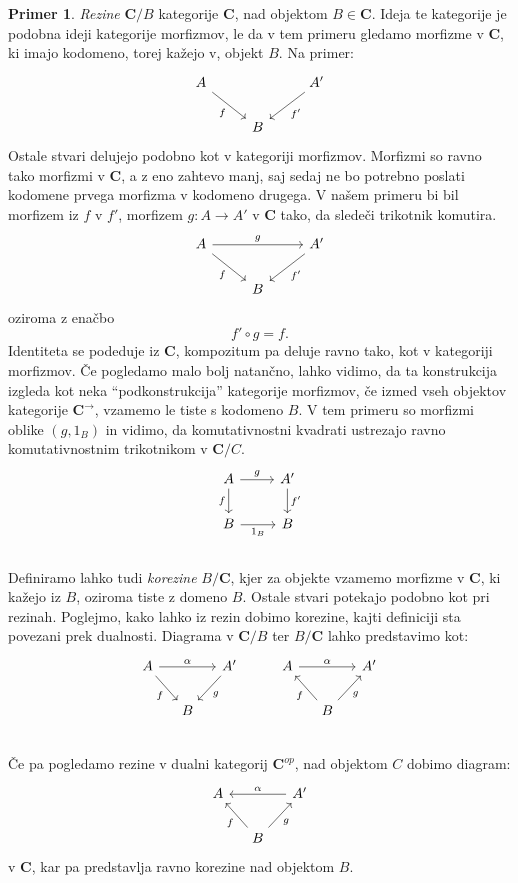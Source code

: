 \documentclass[12pt,a4paper]{book}
\theoremstyle{definition}
\theoremstyle{plain}
\theoremstyle{definition}
\newtheorem{primer}{Primer}[section]
\theoremstyle{remark}
\newcommand{\cat}[1]{\textbf{#1}}
\begin{document}
\begin{primer}
\emph{Rezine} $\cat{C}/B$ kategorije $\cat{C}$, nad objektom $B \in \cat{C}$. Ideja te kategorije je podobna ideji kategorije morfizmov, le da v tem primeru gledamo morfizme v $\cat{C}$, ki imajo kodomeno, torej kažejo v, objekt $B$. Na primer:
%
\[ \begin{tikzcd}
A \arrow[rd, "f"'] & & \arrow[ld, "f'"] A' \\
& B &
\end{tikzcd} \]
%
Ostale stvari delujejo podobno kot v kategoriji morfizmov. Morfizmi so ravno tako morfizmi v $\cat{C}$, a z eno zahtevo manj, saj sedaj ne bo potrebno poslati kodomene prvega morfizma v kodomeno drugega. V našem primeru bi bil morfizem iz $f$ v $f'$, morfizem $g : A \to A'$ v $\cat{C}$ tako, da sledeči trikotnik komutira.
%
\[ \begin{tikzcd}
A \arrow[rd, "f"'] \ar[rr, "g"] & & \arrow[ld, "f'"] A' \\
& B &
\end{tikzcd} \]
oziroma z enačbo
$$f' \circ g = f.$$
Identiteta se podeduje iz $\cat{C}$, kompozitum pa deluje ravno tako, kot v kategoriji morfizmov. Če pogledamo malo bolj natančno, lahko vidimo, da ta konstrukcija izgleda kot neka "`podkonstrukcija"' kategorije morfizmov, če izmed vseh objektov kategorije $\cat{C}^{\rightarrow}$, vzamemo le tiste s kodomeno $B$. V tem primeru so morfizmi oblike $(g, 1_B)$ in vidimo, da komutativnostni kvadrati ustrezajo ravno komutativnostnim trikotnikom v $\cat{C}/C$.
%
\[ \begin{tikzcd}
A \ar[d, "f"'] \ar[r, "g"] & A' \ar[d, "f'"] \\
B \ar[r, "1_B"'] & B \\
\end{tikzcd} \]
%
Definiramo lahko tudi \emph{korezine} $B/\cat{C}$, kjer za objekte vzamemo morfizme v $\cat{C}$, ki kažejo iz $B$, oziroma tiste z domeno $B$. Ostale stvari potekajo podobno kot pri rezinah.
Poglejmo, kako lahko iz rezin dobimo korezine, kajti definiciji sta povezani prek dualnosti.
Diagrama v $\cat{C}/B$ ter $B/\cat{C}$ lahko predstavimo kot:
$$\begin{tikzcd}[column sep=small]
A \ar[dr, "f"'] \ar[rr, "\alpha"] & &  A' \ar[dl, "g"] & & A \ar[rr, "\alpha"] && A' \\
& B &  & & & B \ar[ul, "f"] \ar[ur, "g"'] & \\
\end{tikzcd}$$
Če pa pogledamo rezine v dualni kategorij $\cat{C}^{op}$, nad objektom $C$ dobimo diagram:
$$\begin{tikzcd}[column sep=small]
A && A' \ar[ll, "\alpha"'] \\
& B \ar[ul, "f"] \ar[ur, "g"'] &
\end{tikzcd}$$
v $\cat{C}$, kar pa predstavlja ravno korezine nad objektom $B$.

\end{primer}
\end{document}
